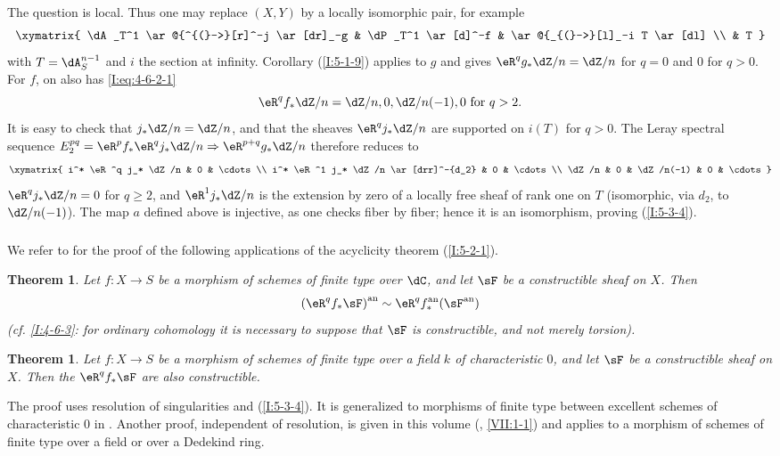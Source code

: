 \documentclass[12pt,oneside,english]{smfbook}
\newcounter{char}
\newcommand{\an}[1]{{#1}^{\textnormal{an}}}
\newtheorem{theorem}[subsubsection]{Theorem}
\begin{document}
The question is local. Thus one may replace $(X,Y)$ by a locally isomorphic pair, for example
\[\xymatrix{
  \dA_T^1 \ar@{^{(}->}[r]^-j \ar[dr]_-g
    & \dP_T^1 \ar[d]^-f
    & \ar@{_{(}->}[l]_-i T \ar[dl] \\
  & T
}\]
with $T=\dA_S^{n-1}$ and $i$ the section at infinity. Corollary (\ref{I:5-1-9}) applies to $g$ and gives $\eR^qg_*\dZ/n=\dZ/n$ for $q=0$ and $0$ for $q>0$. For $f$, on also has \eqref{I:eq:4-6-2-1}
\[
  \eR^q f_* \dZ/n = \dZ/n,0,\dZ/n(-1),0 \text{ for $q>2$.}
\]
It is easy to check that $j_*\dZ/n=\dZ/n$, and that the sheaves $\eR^qj_*\dZ/n$ are supported on $i(T)$ for $q>0$. The Leray spectral sequence $E_2^{pq}=\eR^pf_*\eR^qj_*\dZ/n\Rightarrow\eR^{p+q}g_*\dZ/n$ therefore reduces to
\[\xymatrix{
  i^* \eR^q j_* \dZ/n & 0 & \cdots \\
  i^* \eR^1 j_* \dZ/n \ar[drr]^-{d_2} & 0 & \cdots \\
  \dZ/n              & 0 & \dZ/n(-1) & 0 & \cdots
}\]
$\eR^qj_*\dZ/n=0$ for $q\geqslant2$, and $\eR^1j_*\dZ/n$ is the extension by zero of a locally free sheaf of rank one on $T$ (isomorphic, via $d_2$, to $\dZ/n(-1)$). The map $a$ defined above is injective, as one checks fiber by fiber; hence it is an isomorphism, proving (\ref{I:5-3-4}).

\subsubsection{}\label{I:5-3-5}

We refer to \cite[XVI.4,5]{sga4} for the proof of the following applications of the acyclicity theorem (\ref{I:5-2-1}).

\begin{theorem}\label{I:5-3-6} %
Let $f:X\to S$ be a morphism of schemes of finite type over $\dC$, and let $\sF$ be a constructible sheaf on $X$. Then
\[
  \an{(\eR^q f_*\sF)} \sim \eR^q \an f_* (\an\sF)
\]
(cf. \ref{I:4-6-3}: for ordinary cohomology it is necessary to suppose that $\sF$ is constructible, and not merely torsion).
\end{theorem}

\begin{theorem}\label{I:5-3-7} %
Let $f:X\to S$ be a morphism of schemes of finite type over a field $k$ of characteristic $0$, and let $\sF$ be a constructible sheaf on $X$. Then the $\eR^qf_*\sF$ are also constructible.
\end{theorem}

The proof uses resolution of singularities and (\ref{I:5-3-4}). It is generalized to morphisms of finite type between excellent schemes of characteristic $0$ in \cite[XIX.5]{sga4}. Another proof, independent of resolution, is given in this volume (, \ref{VII:1-1})
and applies to a morphism of schemes of finite type over a field or over a Dedekind ring.
\end{document}
